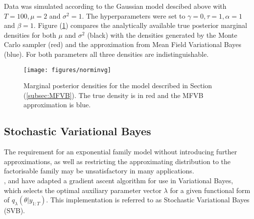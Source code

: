 \documentclass[
12pt, %
onehalfspacing, %
nohyperref, %
headsepline, %
chapterinoneline, %
]{MastersDoctoralThesis} %
\begin{document}
\vspace{4mm}
Data was simulated according to the Gaussian model descibed above with $T = 100, \mu = 2$ and $\sigma^2 = 1$. The hyperparameters were set to $\gamma = 0, \tau = 1, \alpha = 1$ and $\beta = 1$. Figure (\ref{fig:MFVB}) compares the analytically available true posterior marginal densities for both $\mu$ and $\sigma^2$ (black) with the densities generated by the Monte Carlo sampler (red) and the approximation from Mean Field Variational Bayes (blue). For both parameters all three densities are indistinguishable.

\begin{figure}[htbp ]
\centering
\texttt{[image: figures/norminvg]}
\caption{Marginal posterior densities for the model described in Section (\ref{subsec:MFVB}). The true density is in red and the MFVB approximation is blue.}
\label{fig:MFVB}
\end{figure}



\subsection{Stochastic Variational Bayes} \label{subsec:SVB}

The requirement for an exponential family model without introducing further approximations, as well as restricting the approximating distribution to the factorisable family may be unsatisfactory in many applications.
\\

\citet{Paisley2012}, \citet{Hoffman2013} and \citet{Ranganath2014} have adapted a gradient ascent algorithm for use in Variational Bayes, which selects the optimal auxiliary parameter vector $\lambda$ for a given functional form of $q_{\lambda}(\theta | y_{1:T})$. This implementation is referred to as Stochastic Variational Bayes (SVB).
\\
\end{document}
